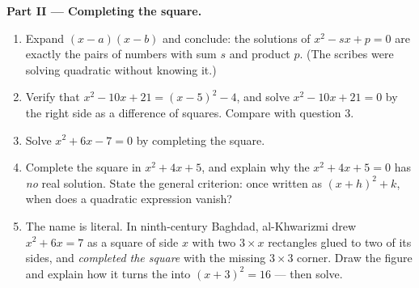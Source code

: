 \begin{problem}[{Weekend problem --- sum-and-product problems,
completing the square the way al-Khwarizmi drew it, and the
equation $x^2 = x + 1$}]
\medskip
\noindent\textbf{Part II --- Completing the square.}
\begin{enumerate}[resume]
  \item Expand $(x - a)(x - b)$ and conclude: the solutions of
        $x^2 - sx + p = 0$ are exactly the pairs of numbers with
        sum $s$ and product $p$. (The scribes were solving
        quadratic  without knowing it.)
  \item Verify that $x^2 - 10x + 21 = (x - 5)^2 - 4$, and solve
        $x^2 - 10x + 21 = 0$ by  the right side as a
        difference of squares. Compare with question 3.
  \item Solve $x^2 + 6x - 7 = 0$ by completing the square.
  \item Complete the square in $x^2 + 4x + 5$, and explain why
        the  $x^2 + 4x + 5 = 0$ has \emph{no} real
        solution. State the general criterion: once written as
        $(x + h)^2 + k$, when does a quadratic expression
        vanish?
  \item The name is literal. In ninth-century Baghdad,
        al-Khwarizmi drew $x^2 + 6x = 7$ as a square of side $x$
        with two $3 \times x$ rectangles glued to two of its
        sides, and \emph{completed the square} with the missing
        $3 \times 3$ corner. Draw the figure and explain how it
        turns the  into $(x + 3)^2 = 16$ --- then solve.
\end{enumerate}


\end{problem}
